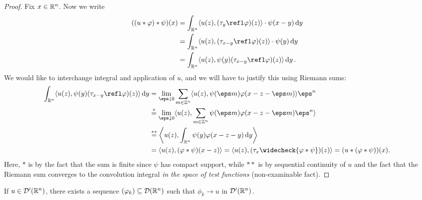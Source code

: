 \begin{proof}
	Fix $x \in \mathbb R^n$. Now we write
	\begin{align*}
		((u * \phi) * \psi)(x) &= \int_{\RR^n} \ang{u(z), (\tau_y \refl\phi)(z)} \cdot \psi(x-y) \dd{y} \\
		&= \int_{\RR^n} \ang{u(z), (\tau_{x-y}\refl\phi)(z)} \cdot \psi(y) \dd{y} \\
		&= \int_{\RR^n} \ang{u(z), \psi(y) (\tau_{x-y} \refl\phi)(z)} \dd{y}.
	\end{align*}
We would like to interchange integral and application of $u$, and we will have to justify this using Riemann sums: 
\begin{align*}
\int_{\RR^n} \ang{u(z), \psi(y) (\tau_{x-y} \refl\phi)(z)} \dd{y} &= \lim_{\eps \downarrow 0} \sum_{m \in \ZZ^n} \ang{u(z), \psi(\eps m) \phi(x - z - \eps m)} \eps^n \\
&\overset*= \lim_{\eps\downarrow0} \ang{u(z), \sum_{m \in \ZZ^n} \psi(\eps m) \phi(x - z - \eps m)\eps^n } \\
&\overset{**}= \ang*{u(z), \int_{\RR^n} \psi(y) \phi(x - z - y) \dd{y}} \\
&= \ang{u(z), (\phi * \psi)(x - z)} = \ang{u(z), (\tau_x\widecheck{\phi * \psi})(z)} = (u * (\phi * \psi))(x). 
\end{align*}
Here, $*$ is by the fact that the sum is finite since $\psi$ has compact support, while $**$ is by sequential continuity of $u$ and the fact that the Riemann sum converges to the convolution integral \emph{in the space of test functions} (non-examinable fact). 
\end{proof}

\begin{theorem}
	If $u \in \mathcal D'(\mathbb R^n)$, there exists a sequence $(\varphi_k) \subseteq \mathcal D(\mathbb R^n)$ such that $\phi_k \to u$ in $\mathcal D'(\mathbb R^n)$. 
\end{theorem}


